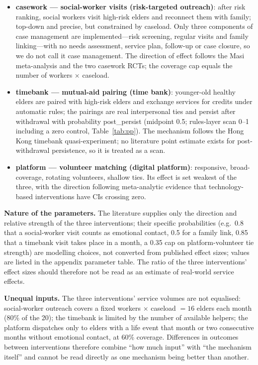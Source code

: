 \documentclass[10pt,twocolumn]{article}
\begin{document}
\begin{itemize}
  \item \textbf{casework --- social-worker visits (risk-targeted outreach)}: after risk ranking, social workers visit high-risk elders and reconnect them with family; top-down and precise, but constrained by caseload. Only three components of case management are implemented---risk screening, regular visits and family linking---with no needs assessment, service plan, follow-up or case closure, so we do not call it case management. The direction of effect follows the Masi meta-analysis\citep{masi2011meta} and the two casework RCTs\citep{ristolainen2020effects,taube2018case}; the coverage cap equals the number of workers $\times$ caseload.
  \item \textbf{timebank --- mutual-aid pairing (time bank)}: younger-old healthy elders are paired with high-risk elders and exchange services for credits under automatic rules; the pairings are real interpersonal ties and persist after withdrawal with probability post\_persist (midpoint 0.5; rules-layer scan 0--1 including a zero control, Table~\ref{tab:pp}). The mechanism follows the Hong Kong timebank quasi-experiment\citep{lu2024timebank}; no literature point estimate exists for post-withdrawal persistence, so it is treated as a scan.
  \item \textbf{platform --- volunteer matching (digital platform)}: responsive, broad-coverage, rotating volunteers, shallow ties. Its effect is set weakest of the three, with the direction following meta-analytic evidence that technology-based interventions have CIs crossing zero\citep{hoang2022interventions}.
\end{itemize}
\textbf{Nature of the parameters.} The literature supplies only the direction and relative strength of the three interventions; their specific probabilities (e.g.\ 0.8 that a social-worker visit counts as emotional contact, 0.5 for a family link, 0.85 that a timebank visit takes place in a month, a 0.35 cap on platform-volunteer tie strength) are modelling choices, not converted from published effect sizes; values are listed in the appendix parameter table. The ratio of the three interventions' effect sizes should therefore not be read as an estimate of real-world service effects.

\textbf{Unequal inputs.} The three interventions' service volumes are not equalised: social-worker outreach covers a fixed workers $\times$ caseload $=16$ elders each month (80\% of the 20); the timebank is limited by the number of available helpers; the platform dispatches only to elders with a life event that month or two consecutive months without emotional contact, at 60\% coverage. Differences in outcomes between interventions therefore combine ``how much input'' with ``the mechanism itself'' and cannot be read directly as one mechanism being better than another.
\end{document}
